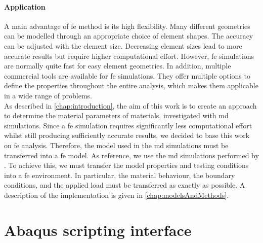 \paragraph{Application}
A main advantage of \acrshort{fe} method is its high flexibility. Many different geometries can be modelled through an appropriate choice of element shapes. The accuracy can be adjusted with the element size. Decreasing element sizes lead to more accurate results but require higher computational effort. However, \acrshort{fe} simulations are normally quite fast for easy element geometries. In addition, multiple commercial tools are available for \acrshort{fe} simulations. They offer multiple options to define the properties throughout the entire analysis, which makes them applicable in a wide range of problems. \\
As described in \autoref{chap:introduction}, the aim of this work is to create an approach to determine the material parameters of materials, investigated with \acrshort{md} simulations. Since a \acrshort{fe} simulation requires significantly less computational effort whilst still producing sufficiently accurate results, we decided to base this work on \acrshort{fe} analysis. Therefore, the model used in the \acrshort{md} simulations must be transferred into a \acrshort{fe} model. As reference, we use the \acrshort{md} simulations performed by \citet{ries_deciphering_nodate}. To achieve this, we must transfer the model properties and testing conditions into a \acrshort{fe} environment. In particular, the material behaviour, the boundary conditions, and the applied load must be transferred as exactly as possible. A description of the implementation is given in \autoref{chap:modelsAndMethods}.


\section{Abaqus scripting interface} \label{sec: AbaqusBasics}

